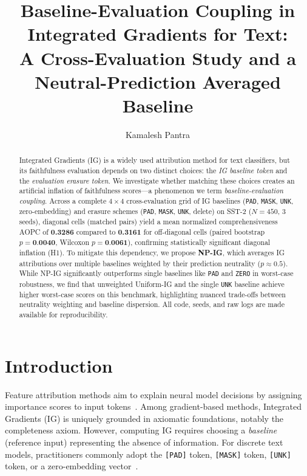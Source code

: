 \documentclass[11pt]{article}
\title{Baseline-Evaluation Coupling in Integrated Gradients for Text:\\A Cross-Evaluation Study and a Neutral-Prediction Averaged Baseline}
\author{Kamalesh Pantra}
\begin{document}
\maketitle

\begin{abstract}
Integrated Gradients (IG) is a widely used attribution method for text classifiers, but its faithfulness evaluation depends on two distinct choices: the \emph{IG baseline token} and the \emph{evaluation erasure token}. We investigate whether matching these choices creates an artificial inflation of faithfulness scores---a phenomenon we term \emph{baseline-evaluation coupling}. Across a complete $4\times 4$ cross-evaluation grid of IG baselines (\texttt{PAD}, \texttt{MASK}, \texttt{UNK}, zero-embedding) and erasure schemes (\texttt{PAD}, \texttt{MASK}, \texttt{UNK}, delete) on SST-2 ($N=450$, 3 seeds), diagonal cells (matched pairs) yield a mean normalized comprehensiveness AOPC of \textbf{0.3286} compared to \textbf{0.3161} for off-diagonal cells (paired bootstrap $p=\textbf{0.0040}$, Wilcoxon $p=\textbf{0.0061}$), confirming statistically significant diagonal inflation (H1). To mitigate this dependency, we propose \textbf{NP-IG}, which averages IG attributions over multiple baselines weighted by their prediction neutrality ($p\approx 0.5$). While NP-IG significantly outperforms single baselines like \texttt{PAD} and \texttt{ZERO} in worst-case robustness, we find that unweighted Uniform-IG and the single \texttt{UNK} baseline achieve higher worst-case scores on this benchmark, highlighting nuanced trade-offs between neutrality weighting and baseline dispersion. All code, seeds, and raw logs are made available for reproducibility.
\end{abstract}

\section{Introduction}
\label{sec:intro}

Feature attribution methods aim to explain neural model decisions by assigning importance scores to input tokens~\citep{sundararajan2017axiomatic,jacovi2020towards}. Among gradient-based methods, Integrated Gradients (IG) is uniquely grounded in axiomatic foundations, notably the completeness axiom. However, computing IG requires choosing a \emph{baseline} (reference input) representing the absence of information. For discrete text models, practitioners commonly adopt the \texttt{[PAD]} token, \texttt{[MASK]} token, \texttt{[UNK]} token, or a zero-embedding vector~\citep{sanyal2021discretized,enguehard2023sequential,hentschel2024canonical}.
\end{document}
